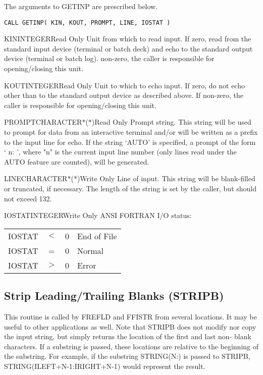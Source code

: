 The arguments to GETINP are prescribed below.

\verb+CALL GETINP( KIN, KOUT, PROMPT, LINE, IOSTAT )+

\begin{argy}{KIN}{INTEGER}{Read Only}
Unit from which to read input.  If zero, read from the
standard input device (terminal or batch deck) and echo
to the standard output device (terminal or batch log).
non-zero, the caller is responsible for opening/closing this unit.
\end{argy}

\begin{argy}{KOUT}{INTEGER}{Read Only}
Unit to which to echo input.  If zero, do not echo other
than to the standard output device as described above.
If non-zero, the caller is responsible for opening/closing this unit.
\end{argy}

\begin{argy}{PROMPT}{CHARACTER$*$($*$)}{Read Only}
Prompt string.  This string will be used to prompt for
data from an interactive terminal and/or will be written
as a prefix to the input line for echo.  If the string
`AUTO' is specified, a prompt of the form `   n: ',
where "n" is the current input line number (only lines
read under the AUTO feature are counted), will be
generated.
\end{argy}

\begin{argy}{LINE}{CHARACTER$*$($*$)}{Write Only}
Line of input.  This string will be blank-filled or
truncated, if necessary.  The length of the string is
set by the caller, but should not exceed 132.
\end{argy}

\begin{argy}{IOSTAT}{INTEGER}{Write Only}
ANSI FORTRAN I/O status:\\
\begin{tabular}{cccl}
IOSTAT &$<$ & 0 & End of File\\
IOSTAT &=   & 0 & Normal\\
IOSTAT &$>$ & 0 & Error\\
\end{tabular}
\end{argy}

\subsection{Strip Leading/Trailing Blanks (STRIPB)}\label{sec:stripb}
This routine is called by FREFLD and FFISTR from several locations.  It may
be useful to other applications as well.  Note that STRIPB does not modify
nor copy the input string, but simply returns the location of the first and
last non- blank characters.  If a substring is passed, these locations are
relative to the beginning of the substring.  For example, if the substring
STRING(N:) is passed to STRIPB, STRING(ILEFT+N-1:IRIGHT+N-1) would represent
the result.

